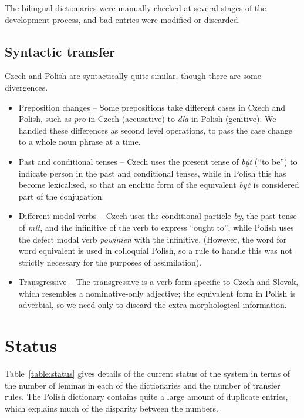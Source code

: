 \documentclass[11pt]{article}
\begin{document}
The bilingual dictionaries were manually checked at several stages of the development 
process, and bad entries were modified or discarded. 

\subsection{Syntactic transfer}

Czech and Polish are syntactically quite similar, though there are some divergences.

\begin{itemize}
\item Preposition changes -- Some prepositions take different cases in Czech and Polish,
such as \emph{pro} in Czech (accusative) to \emph{dla} in Polish (genitive). We handled
these differences as second level operations, to pass the case change to a whole noun
phrase at a time.
\item Past and conditional tenses -- Czech uses the present tense of \emph{být} (``to be'') to 
indicate person in the past and conditional tenses, while in Polish this has become
lexicalised, so that an enclitic form of the equivalent \emph{być} is considered part
of the conjugation.
\item Different modal verbs -- Czech uses the conditional particle \emph{by}, the past tense
of \emph{mít}, and the infinitive of the verb to express ``ought to'', while Polish uses
the defect modal verb \emph{powinien} with the infinitive. (However, the word for word
equivalent is used in colloquial Polish, so a rule to handle this was not strictly 
necessary for the purposes of assimilation).
\item Transgressive -- The transgressive is a verb form specific to Czech and
Slovak, which resembles a nominative-only adjective; the equivalent form in Polish is
adverbial, so we need only to discard the extra morphological information.
\end{itemize}

\section{Status}

Table~\ref{table:status} gives details of the current status of the system
in terms of the number of lemmas in each of the dictionaries and the number 
of transfer rules. The Polish dictionary contains quite a large amount of
duplicate entries, which explains much of the disparity between the numbers.
\end{document}
